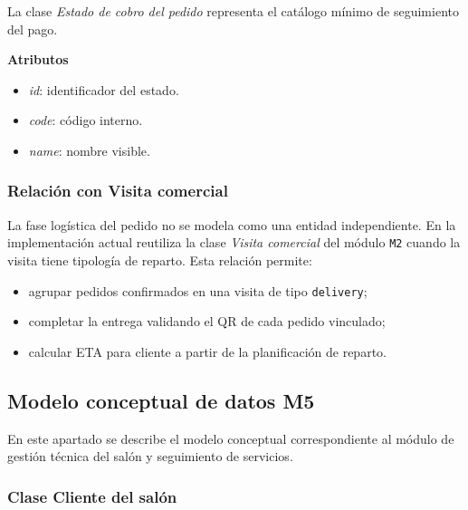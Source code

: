 La clase \textit{Estado de cobro del pedido} representa el catálogo mínimo de seguimiento del pago.

\textbf{Atributos}

\begin{itemize}
      \item \textit{id}: identificador del estado.
      \item \textit{code}: código interno.
      \item \textit{name}: nombre visible.
\end{itemize}

\subsubsection{Relación con Visita comercial}

La fase logística del pedido no se modela como una entidad independiente. En la implementación actual reutiliza la clase \textit{Visita comercial} del módulo \texttt{M2} cuando la visita tiene tipología de reparto. Esta relación permite:

\begin{itemize}
      \item agrupar pedidos confirmados en una visita de tipo \texttt{delivery};
      \item completar la entrega validando el QR de cada pedido vinculado;
      \item calcular ETA para cliente a partir de la planificación de reparto.
\end{itemize}

\subsection{Modelo conceptual de datos M5}

En este apartado se describe el modelo conceptual correspondiente al módulo de gestión técnica del salón y seguimiento de servicios.


\subsubsection{Clase Cliente del salón}

